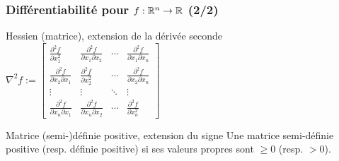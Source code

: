 \documentclass{beamer}
\newcommand{\R}{{\ensuremath\mathbb{R}}}
\begin{document}
\begin{frame}
  \frametitle{Différentiabilité pour $f: \R^n \rightarrow \R$ (2/2)}
  
  \begin{block}{Hessien (matrice), extension de la dérivée seconde}
    $\nabla^2 f :=
    \begin{bmatrix}{\frac {\partial ^{2}f}{\partial x_{1}^{2}}}&{\frac {\partial ^{2}f}{\partial x_{1}\partial x_{2}}}&\cdots &{\frac {\partial ^{2}f}{\partial x_{1}\partial x_{n}}}\\{\frac {\partial ^{2}f}{\partial x_{2}\partial x_{1}}}&{\frac {\partial ^{2}f}{\partial x_{2}^{2}}}&\cdots &{\frac {\partial ^{2}f}{\partial x_{2}\partial x_{n}}}\\\vdots &\vdots &\ddots &\vdots \\{\frac {\partial ^{2}f}{\partial x_{n}\partial x_{1}}}&{\frac {\partial ^{2}f}{\partial x_{n}\partial x_{2}}}&\cdots &{\frac {\partial ^{2}f}{\partial x_{n}^{2}}}\end{bmatrix}$
  \end{block}

  \begin{block}{Matrice (semi-)définie positive, extension du signe}
    Une matrice semi-définie positive (resp. définie positive) si 
    ses valeurs propres sont $\geq 0$ (resp. $> 0$).
  \end{block}

\end{frame}
\end{document}
